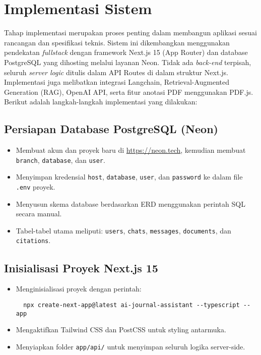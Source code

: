 \section{Implementasi Sistem}

Tahap implementasi merupakan proses penting dalam membangun aplikasi sesuai rancangan dan spesifikasi teknis. Sistem ini dikembangkan menggunakan pendekatan \textit{fullstack} dengan framework Next.js 15 (App Router) dan database PostgreSQL yang dihosting melalui layanan Neon. Tidak ada \textit{back-end} terpisah, seluruh \textit{server logic} ditulis dalam API Routes di dalam struktur Next.js. Implementasi juga melibatkan integrasi Langchain, Retrieval-Augmented Generation (RAG), OpenAI API, serta fitur anotasi PDF menggunakan PDF.js. Berikut adalah langkah-langkah implementasi yang dilakukan:

\subsection{Persiapan Database PostgreSQL (Neon)}

\begin{itemize}
  \item Membuat akun dan proyek baru di \url{https://neon.tech}, kemudian membuat \texttt{branch}, \texttt{database}, dan \texttt{user}.
  \item Menyimpan kredensial \texttt{host}, \texttt{database}, \texttt{user}, dan \texttt{password} ke dalam file \texttt{.env} proyek.
  \item Menyusun skema database berdasarkan ERD menggunakan perintah SQL secara manual.
  \item Tabel-tabel utama meliputi: \texttt{users}, \texttt{chats}, \texttt{messages}, \texttt{documents}, dan \texttt{citations}.
\end{itemize}

\subsection{Inisialisasi Proyek Next.js 15}

\begin{itemize}
  \item Menginisialisasi proyek dengan perintah:
  \begin{verbatim}
  npx create-next-app@latest ai-journal-assistant --typescript --app
  \end{verbatim}
  \item Mengaktifkan Tailwind CSS dan PostCSS untuk styling antarmuka.
  \item Menyiapkan folder \texttt{app/api/} untuk menyimpan seluruh logika server-side.
\end{itemize}

